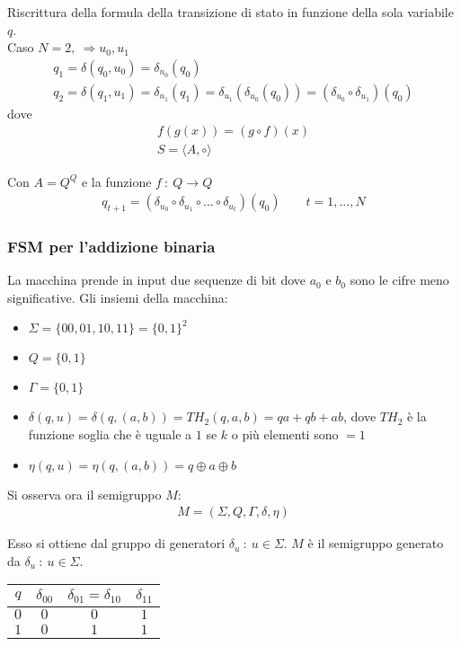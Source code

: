 \documentclass[a4paper,portrait,12pt]{article}
\theoremstyle{definition}
\begin{document}
Riscrittura della formula della transizione di stato in funzione della sola variabile $q$.\\

Caso $N=2,\ \Rightarrow u_0, u_1$
\begin{gather*}
q_1 = \delta(q_0,u_0) = \delta_{n_0}(q_0)\\
q_2 = \delta(q_1,u_1) = \delta_{n_1}(q_1)=\delta_{u_1}(\delta_{u_0}(q_0)) = (\delta_{u_0} \circ \delta_{u_1})(q_0)
\end{gather*}
dove
\begin{gather*}
f(g(x)) = (g \circ f)(x)\\
S = \langle A, \circ \rangle
\end{gather*}

Con $A = Q^Q$ e la funzione $f\ :\ Q \to Q$
\begin{gather*}
q_{t+1} = (\delta_{u_0} \circ \delta_{u_1} \circ ... \circ \delta_{u_t})(q_0)\qquad t = 1,...,N
\end{gather*}


\subsubsection{FSM per l'addizione binaria}

La macchina prende in input due sequenze di bit dove $a_0$ e $b_0$ sono le cifre meno significative.
Gli insiemi della macchina:
\begin{itemize}
\item $\Sigma = \{00,01,10,11\} = \{0,1\}^2$
\item $Q = \{0,1\}$
\item $\Gamma = \{0,1\}$
\item $\delta(q,u) = \delta(q,(a,b)) = TH_2(q,a,b) = qa+qb+ab$, dove $TH_2$ è la funzione soglia che è uguale a $1$ se $k$ o più elementi sono $= 1$
\item $\eta(q,u) = \eta(q,(a,b)) = q \oplus a \oplus b$
\end{itemize}

Si osserva ora il semigruppo $M$:
\begin{gather*}
M = (\Sigma,Q,\Gamma,\delta,\eta)
\end{gather*}

Esso si ottiene dal gruppo di generatori $\delta_u\ :\ u \in \Sigma$. $M$ è il semigruppo generato da $\delta_u\ :\ u \in \Sigma$.

\begin{center}
\begin{tabular}{c|c c c}
$q$ & $\delta_{00}$ & $\delta_{01} = \delta_{10}$ & $\delta_{11}$ \\ \hline
$0$ & $0$ & $0$ & $1$ \\
$1$ & $0$ & $1$ & $1$ \\
\end{tabular}
\end{center}
\end{document}
